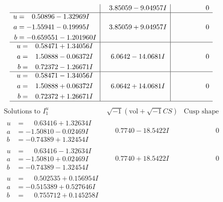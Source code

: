 \documentclass[1p]{elsarticle_modified}
\theoremstyle{definition}
\newcommand{\I}{\sqrt{-1}}
\begin{document}
$$\begin{array}{c|c|c}
 & \phantom{-}3.85059 - 9.04957 I & \phantom{-0.000000 } 0 \\ \hline\begin{aligned}
u &= \phantom{-}0.50896 - 1.32969 I \\
a &= -1.55941 - 0.19995 I \\
b &= -0.659551 - 1.201960 I\end{aligned}
 & \phantom{-}3.85059 + 9.04957 I & \phantom{-0.000000 } 0 \\ \hline\begin{aligned}
u &= \phantom{-}0.58471 + 1.34056 I \\
a &= \phantom{-}1.50888 - 0.06372 I \\
b &= \phantom{-}0.72372 - 1.26671 I\end{aligned}
 & \phantom{-}6.0642 - 14.0681 I & \phantom{-0.000000 } 0 \\ \hline\begin{aligned}
u &= \phantom{-}0.58471 - 1.34056 I \\
a &= \phantom{-}1.50888 + 0.06372 I \\
b &= \phantom{-}0.72372 + 1.26671 I\end{aligned}
 & \phantom{-}6.0642 + 14.0681 I & \phantom{-0.000000 } 0\\
 \hline 
 \end{array}$$\newpage$$\begin{array}{c|c|c}  
\text{Solutions to }I^u_{1}& \I (\text{vol} + \sqrt{-1}CS) & \text{Cusp shape}\\
 \hline 
\begin{aligned}
u &= \phantom{-}0.63416 + 1.32634 I \\
a &= -1.50810 - 0.02469 I \\
b &= -0.74389 + 1.32454 I\end{aligned}
 & \phantom{-}0.7740 - 18.5422 I & \phantom{-0.000000 } 0 \\ \hline\begin{aligned}
u &= \phantom{-}0.63416 - 1.32634 I \\
a &= -1.50810 + 0.02469 I \\
b &= -0.74389 - 1.32454 I\end{aligned}
 & \phantom{-}0.7740 + 18.5422 I & \phantom{-0.000000 } 0 \\ \hline\begin{aligned}
u &= \phantom{-}0.502535 + 0.156954 I \\
a &= -0.515389 + 0.527646 I \\
b &= \phantom{-}0.755712 + 0.145258 I\end{aligned}

\end{array}$$
\end{document}
